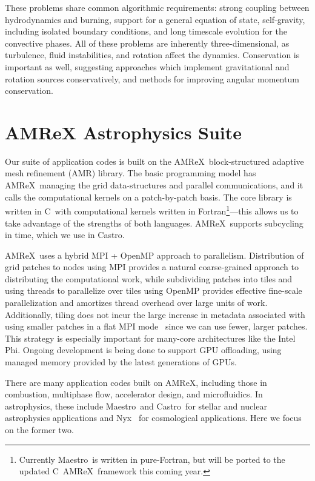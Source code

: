 \documentclass[a4paper]{jpconf}
\newcommand{\maestro}{{\sffamily Maestro}}
\newcommand{\castro}{{\sffamily Castro}}
\newcommand{\nyx}{{\sffamily Nyx}}
\newcommand{\amrex}{{\sffamily AMReX}}
\newcommand{\cpp}{C\nolinebreak\hspace{-.05em}\raisebox{.4ex}{\tiny\bf +}\nolinebreak\hspace{-.10em}\raisebox{.4ex}{\tiny\bf +}}
\newcommand{\MarginPar}[1]{\marginpar{\vskip-\baselineskip\raggedright\tiny\sffamily\hrule\smallskip{\color{red}#1}\par\smallskip\hrule}}
\begin{document}
These problems share common algorithmic requirements: strong coupling
between hydrodynamics and burning, support for a general equation of state,
self-gravity, including isolated boundary conditions, and long timescale
evolution for the convective phases.  All of these problems are inherently
three-dimensional, as turbulence, fluid instabilities, and rotation affect
the dynamics.  Conservation is important as well, suggesting approaches
which implement gravitational and rotation sources conservatively, and
methods for improving angular momentum conservation.


\section{AMReX Astrophysics Suite}

Our suite of application codes is built on the
\amrex\ block-structured adaptive mesh refinement (AMR) library.  The
basic programming model has \amrex\ managing the grid data-structures
and parallel communications, and it calls the computational kernels on
a patch-by-patch basis.  The core library is written in \cpp\ with 
computational kernels written in Fortran\footnote{Currently
  \maestro\ is written in pure-Fortran, but will be
  ported to the updated \cpp\ \amrex\ framework this coming year.}---this allows us to take
advantage of the strengths of both languages. \amrex\ supports subcycling
in time, which we use in \castro.

\amrex\ uses a hybrid MPI + OpenMP approach to parallelism.
Distribution of grid patches to nodes using MPI provides a natural
coarse-grained approach to distributing the computational work, while
subdividing patches into tiles and using threads to parallelize over
tiles using OpenMP provides effective fine-scale parallelization and
amortizes thread overhead over large units of work.  Additionally,
tiling does not incur the large increase in metadata
associated with using smaller patches in a flat MPI
mode~\cite{tiling} since we can use fewer, larger patches.
This strategy is especially important for
many-core architectures like the Intel Phi.  Ongoing development is being
done to support GPU offloading, using managed memory provided by the
latest generations of GPUs.

There are many application codes built on \amrex, including those in
combustion, multiphase flow, accelerator design, and microfluidics. In
astrophysics, these include \maestro\ and \castro\ for stellar and
nuclear astrophysics applications and \nyx~\cite{nyx} for cosmological
applications.  Here we focus on the former two.
\MarginPar{ajn - I want to put a grid picture in this doc somewhere}
\end{document}
